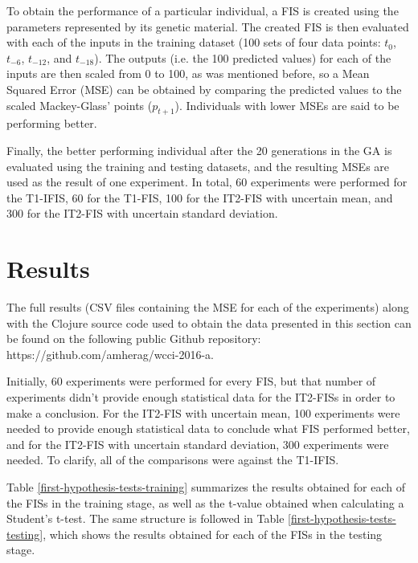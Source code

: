 \documentclass[conference]{IEEEtran}
\begin{document}
To obtain the performance of a particular individual, a FIS is created
using the parameters represented by its genetic material. The created
FIS is then evaluated with each of the inputs in the training dataset
(100 sets of four data points: $t_{0}$, $t_{-6}$, $t_{-12}$, and
$t_{-18}$). The outputs (i.e. the 100 predicted values) for each of
the inputs are then scaled from 0 to 100, as was mentioned before, so
a Mean Squared Error (MSE) can be obtained by comparing the predicted values
to the scaled Mackey-Glass' points ($p_{t+1}$). Individuals with lower
MSEs are said to be performing better.

Finally, the better performing individual after the 20 generations in
the GA is evaluated using the training and testing datasets, and the
resulting MSEs are used as the result of one experiment. In total, 60
experiments were performed for the T1-IFIS, 60 for the T1-FIS, 100 for
the IT2-FIS with uncertain mean, and 300 for the IT2-FIS with
uncertain standard deviation.




\section{Results}
\label{results}

The full results (CSV files containing the MSE for each of the
experiments) along with the Clojure source code used to obtain the
data presented in this section can be found on the following public
Github repository: https://github.com/amherag/wcci-2016-a.

Initially, 60 experiments were performed for every FIS, but that
number of experiments didn't provide enough statistical data for the
IT2-FISs in order to make a conclusion. For the IT2-FIS with uncertain
mean, 100 experiments were needed to provide enough statistical data
to conclude what FIS performed better, and for the IT2-FIS with
uncertain standard deviation, 300 experiments were needed. To clarify,
all of the comparisons were against the T1-IFIS.

Table \ref{first-hypothesis-tests-training} summarizes the results obtained
for each of the FISs in the training stage, as well as the t-value
obtained when calculating a Student's t-test. The same structure is
followed in Table \ref{first-hypothesis-tests-testing}, which shows the
results obtained for each of the FISs in the testing stage.
\end{document}
